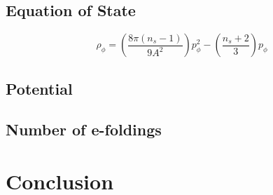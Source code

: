 \documentclass[12pt]{article} %
\begin{document}
\subsection{Equation of State}

\begin{equation}
\rho_{\phi} = \left( \frac{8\pi \left(n_{s}-1\right)}{9 A^{2}}\right)p_{\phi}^{2} - \left(\frac{n_{s}+2}{3}\right)p_{\phi}
\end{equation}

\subsection{Potential}

\subsection{Number of e-foldings}

\section{Conclusion}

{}

\end{document}

